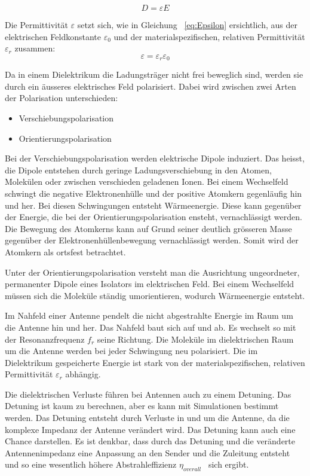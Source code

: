 \begin{equation}\label{eq:FlussdichteD}
D=\varepsilon E
\end{equation}

Die Permittivität $\varepsilon$ setzt sich, wie in Gleichung \ \ref{eq:Epsilon} ersichtlich, aus der elektrischen Feldkonstante $\varepsilon_0$ und der materialspezifischen, relativen Permittivität $\varepsilon_r$ zusammen:
\begin{equation}\label{eq:Epsilon}
\varepsilon = \varepsilon_r \varepsilon_0
\end{equation}

Da in einem Dielektrikum die Ladungsträger nicht frei beweglich sind, werden sie durch ein äusseres elektrisches Feld polarisiert. Dabei wird zwischen zwei Arten der Polarisation unterschieden:
\begin{itemize}
\item Verschiebungspolarisation
\item Orientierungspolarisation
\end{itemize}

Bei der Verschiebungspolarisation werden elektrische Dipole  induziert. Das heisst,  die Dipole entstehen durch geringe Ladungsverschiebung in den Atomen, Molekülen oder zwischen verschieden geladenen Ionen. Bei einem Wechselfeld schwingt die negative Elektronenhülle und der positive Atomkern gegenläufig hin und her.  Bei diesen Schwingungen entsteht  Wärmeenergie.  Diese kann gegenüber der Energie, die bei der Orientierungspolarisation ensteht,  vernachlässigt werden.  Die Bewegung des Atomkerns kann auf Grund seiner deutlich grösseren Masse  gegenüber der Elektronenhüllenbewegung vernachlässigt werden. Somit wird der Atomkern als ortsfest betrachtet. 

Unter der Orientierungspolarisation versteht man die Ausrichtung ungeordneter, permanenter Dipole eines Isolators im elektrischen Feld. Bei einem Wechselfeld müssen sich die Moleküle ständig umorientieren, wodurch Wärmeenergie entsteht.

Im Nahfeld einer Antenne pendelt die nicht abgestrahlte Energie im Raum um die Antenne hin und her. Das Nahfeld baut sich auf und ab. Es wechselt so mit der Resonanzfrequenz $f_r$ seine Richtung. Die Moleküle im dielektrischen Raum um die Antenne werden bei jeder Schwingung neu polarisiert.
Die im Dielektrikum gespeicherte Energie ist stark von der materialspezifischen, relativen Permittivität $\varepsilon_r $ abhängig. 

Die dielektrischen Verluste führen bei Antennen auch zu einem Detuning. Das Detuning ist kaum zu berechnen, aber es kann mit Simulationen bestimmt werden. Das Detuning entsteht durch Verluste in und um die  Antenne, da die komplexe Impedanz der Antenne verändert wird. Das Detuning kann auch eine Chance darstellen. Es ist denkbar, dass durch das Detuning und die veränderte Antennenimpedanz eine Anpassung an den Sender und die Zuleitung entsteht und so eine wesentlich höhere Abstrahleffizienz $\eta_{overall}$ \ sich ergibt.


